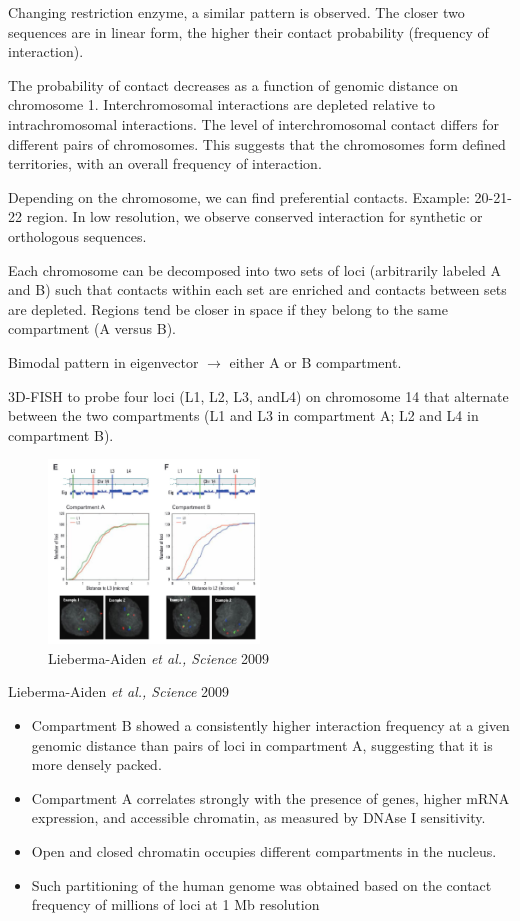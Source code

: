 Changing restriction enzyme, a similar pattern is observed. The closer two sequences are in linear form, the higher their contact probability (frequency of interaction).

The probability of contact decreases as a function of genomic distance on chromosome 1. Interchromosomal interactions are depleted relative to intrachromosomal interactions. The level of interchromosomal contact differs for different pairs of chromosomes. This suggests that the chromosomes form defined territories, with an overall frequency of interaction.

Depending on the chromosome, we can find preferential contacts. Example: 20-21-22 region. In low resolution, we observe conserved interaction for synthetic or orthologous sequences.

Each chromosome can be decomposed into two sets of loci (arbitrarily labeled A and B) such that contacts within each set are enriched and contacts between sets are depleted. Regions tend be closer in space if they belong to the same compartment (A versus B).

Bimodal pattern in eigenvector $\rightarrow$ either A or B compartment.

3D-FISH to probe four loci (L1, L2, L3, andL4) on chromosome 14 that alternate between the two compartments (L1 and L3 in compartment A; L2 and L4 in compartment B).

\begin{figure}
\centering
\includegraphics[width=0.5\textwidth]{../_resources/Screenshot_2022-10-19_at_09-06-00.png}
\caption{Lieberma-Aiden \emph{et al., Science} 2009}
\end{figure}

Lieberma-Aiden \emph{et al., Science} 2009

\begin{itemize}
\tightlist
\item
  Compartment B showed a consistently higher interaction frequency at a given genomic distance than pairs of loci in compartment A, suggesting that it is more densely packed.
\item
  Compartment A correlates strongly with the presence of genes, higher mRNA expression, and accessible chromatin, as measured by DNAse I sensitivity.
\item
  Open and closed chromatin occupies different compartments in the nucleus.
\item
  Such partitioning of the human genome was obtained based on the contact frequency of millions of loci at 1 Mb resolution
\end{itemize}

